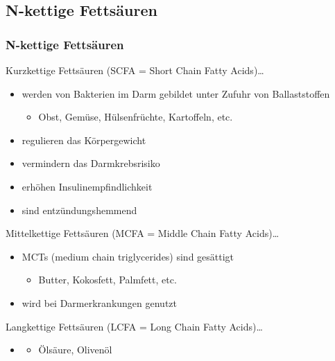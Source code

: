 \documentclass[xcolor=dvipsnames]{beamer}
\begin{document}
    \subsection{N-kettige Fettsäuren}
    \begin{frame}[allowframebreaks]
        \frametitle{N-kettige Fettsäuren}

        \begin{block}{Kurzkettige Fettsäuren (SCFA = Short Chain Fatty Acids)\ldots}
            \begin{itemize}
                \setlength\itemsep{1em}
                \item werden von Bakterien im Darm gebildet unter Zufuhr von Ballaststoffen
                \begin{itemize}
                    \item Obst, Gemüse, Hülsenfrüchte, Kartoffeln, etc.
                \end{itemize}
                \item regulieren das Körpergewicht
                \item vermindern das Darmkrebsrisiko
                \item erhöhen Insulinempfindlichkeit
                \item sind entzündungshemmend
            \end{itemize}
        \end{block}

        \framebreak

        \begin{block}{Mittelkettige Fettsäuren (MCFA = Middle Chain Fatty Acids)\ldots}
            \begin{itemize}
                \setlength\itemsep{1em}
                \item MCTs (medium chain triglycerides) sind gesättigt
                \begin{itemize}
                    \item Butter, Kokosfett, Palmfett, etc.
                \end{itemize}
                \item wird bei Darmerkrankungen genutzt
            \end{itemize}
        \end{block}

        \framebreak

        \begin{block}{Langkettige Fettsäuren (LCFA = Long Chain Fatty Acids)\ldots}
            \begin{itemize}
                \setlength\itemsep{1em}
                \item
                \begin{itemize}
                    \item Ölsäure, Olivenöl
                \end{itemize}
            \end{itemize}
        \end{block}

    \end{frame}
\end{document}
